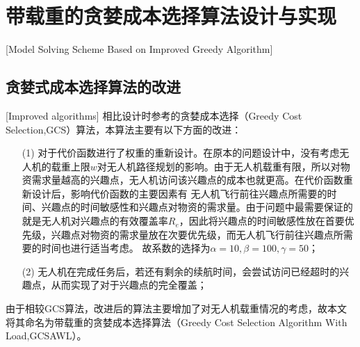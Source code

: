 
\chapter{带载重的贪婪成本选择算法设计与实现}[Model Solving Scheme Based on Improved Greedy Algorithm]

\section{贪婪式成本选择算法的改进}[Improved algorithms]
相比设计时参考的贪婪成本选择（Greedy Cost Selection,GCS）算法，本算法主要有以下方面的改进：
\begin{itemize}
	\item [(1)] 对于代价函数进行了权重的重新设计。在原本的问题设计中，没有考虑无人机的载重上限$w$对无人机路径规划的影响。由于无人机载重有限，所以对物资需求量越高的兴趣点，无人机访问该兴趣点的成本也就更高。在代价函数重新设计后，影响代价函数的主要因素有
无人机飞行前往兴趣点所需要的时间、兴趣点的时间敏感性和兴趣点对物资的需求量。由于问题中最需要保证的就是无人机对兴趣点的有效覆盖率$R_e$，因此将兴趣点的时间敏感性放在首要优先级，兴趣点对物资的需求量放在次要优先级，而无人机飞行前往兴趣点所需要的时间也进行适当考虑。
故系数的选择为$\alpha = 10,\beta = 100,\gamma = 50$；
	\item [(2)] 无人机在完成任务后，若还有剩余的续航时间，会尝试访问已经超时的兴趣点，从而实现了对于兴趣点的完全覆盖；
\end{itemize}


由于相较GCS算法，改进后的算法主要增加了对无人机载重情况的考虑，故本文将其命名为带载重的贪婪成本选择算法（Greedy Cost Selection Algorithm With Load,GCSAWL）。

